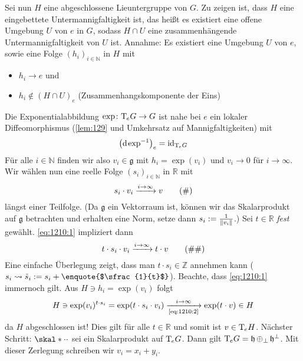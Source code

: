 \begin{beweis}
\begin{enumerate}[1)]
		Sei nun $H$ eine abgeschlossene Lieuntergruppe von $G$.
		Zu zeigen ist, dass $H$ eine eingebettete Untermannigfaltigkeit ist, das heißt es existiert eine offene Umgebung $U$ von $e$ in $G$, sodass $H \cap U$ eine zusammenhängende Untermannigfaltigkeit von $U$ ist. 
		Annahme: Es existiert eine Umgebung $U$ von $e$, sowie eine Folge $(h_i)_{i \in \mathbb{N}}$ in $H$ mit
		\begin{itemize}
			\item $h_i \to e$ und
			\item $h_i \notin (H \cap U)_e$ (Zusammenhangskomponente der Eins)
		\end{itemize}
		Die Exponentialabbildung $\exp \colon \Tmap_e G \to G$ ist nahe bei $e$ ein lokaler Diffeomorphismus (\autoref{lem:129} und Umkehrsatz auf Mannigfaltigkeiten) mit 
		\[
			\enbrace*{\mathd \exp^{-1}}_e = \id_{\Tmap_e G}
		\]
		Für alle $i \in \mathbb{N}$ finden wir also $v_i \in \mathfrak{g}$ mit $h_i = \exp(v_i)$ und $v_i \to 0$ für $i \to \infty$.
		Wir wählen nun eine reelle Folge $(s_i)_{i \in \mathbb{N}}$ in $\mathbb{R}$ mit 
		\begin{equation}
			s_i \cdot v_i \grenzw{i \to \infty} v \label{eq:1210:1} \tag{\#}
		\end{equation}
		längst einer Teilfolge.
		(Da $\mathfrak{g}$ ein Vektorraum ist, können wir das Skalarprodukt auf $\mathfrak{g}$ betrachten und erhalten eine Norm, setze dann $s_i := \frac{1}{\norm*{v_i}} $.)
		Sei $t \in \mathbb{R}$ \emph{fest} gewählt.
		\eqref{eq:1210:1} impliziert dann
		\begin{equation}
			t \cdot s_i \cdot v_i \grenzw{i \to \infty} t \cdot v \label{eq:1210:2} \tag{\#\#}
		\end{equation}
		Eine einfache Überlegung zeigt, dass man $t \cdot s_i \in \mathbb{Z}$ annehmen kann ($s_i \leadsto \tilde{s}_i := s_i + \text{\enquote{$\sfrac{1}{t}$}}$).
		Beachte, dass \eqref{eq:1210:1} immernoch gilt.
		Aus $H \ni h_i = \exp(v_i)$ folgt 
		\[
			H \ni \exp(v_i)^{t \cdot s_i} = \exp \enbrace*{t \cdot s_i \cdot v_i} \xrightarrow[\text{\eqref{eq:1210:2}}]{i \to \infty} \exp(t \cdot v) \in H
		\]
		da $H$ abgeschlossen ist!
		Dies gilt für alle $t \in \mathbb{R}$ und somit ist $v \in \Tmap_e H$.
		Nächster Schritt: $\skal*{\cdot }{\cdot }$ sei ein Skalarprodukt auf $\Tmap_e G$.
		Dann gilt $\Tmap_e G = \mathfrak{h} \mathop{\oplus_{\bot}} \mathfrak{h}^{\bot}$.
		Mit dieser Zerlegung schreiben wir $v_i =x_i + y_i$.

\end{enumerate}
\end{beweis}
